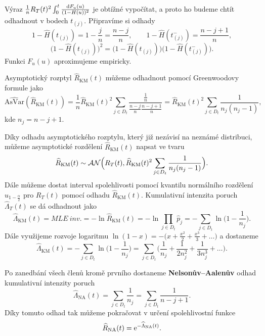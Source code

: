     Výraz $\frac{1}{n}R_T(t)^2 \int_0^t \frac{\mathrm{d} F_u(u)}{(1-H(u))^2}$ je obtížné vypočítat, a proto ho budeme chtít odhadnout v bodech $t_{(j)}$. Připravíme si odhady
    $$ 1 - \widehat{H}(t_{(j)}) = 1 -\frac{j}{n} = \frac{n-j}{n}, \qquad 1 - \widehat{H}(t_{(j)}^{-}) = \frac{n-j+1}{n},$$
    $$ \big(1 - \widehat{H}(t_{(j)})\big)^2 = \big(1 - \widehat{H}(t_{(j)})\big)(1 - \widehat{H}(t_{(j)}^{-})\big).$$ 
    Funkci $F_u(u)$ aproximujeme empiricky.
    
    \begin{theorem}
        Asymptotický rozptyl $\widehat{R}_\mathrm{KM}(t)$ můžeme odhadnout pomocí Greenwoodovy formule jako
        $$ \widehat{\mathrm{AsVar}}(\widehat{R}_\mathrm{KM}(t)) = \frac{1}{n}\widehat{R}_\mathrm{KM}(t)^2 \sum_{j\in D_t} \frac{\frac{1}{n}}{\frac{n-j}{n}\frac{n-j+1}{n}} = \widehat{R}_\mathrm{KM}(t)^2 \sum_{j \in D_t} \frac{1}{n_j(n_j -1)},$$
        kde $n_j = n - j +1$.
    \end{theorem}
    
    Díky odhadu asymptotického rozptylu, který již nezávisí na neznámé distribuci, můžeme asymptotické rozdělení $\widehat{R}_\mathrm{KM}(t)$ napsat ve tvaru
    $$\widehat{R}_\mathrm{KM}(t) \sim \mathcal{AN}\Big(R_T(t), \widehat{R}_\mathrm{KM}(t)^2 \sum_{j \in D_t} \frac{1}{n_j(n_j -1)} \Big).$$
    Dále můžeme dostat interval spolehlivosti pomocí kvantilu normálního rozdělení $u_{1-\frac{\alpha}{2}}$ pro $R_T(t)$ pomocí odhadu $\widehat{R}_\mathrm{KM}(t)$. Kumulativní intenzita poruch $\widehat{\Lambda}_T(t)$ se dá odhadnout jako
    $$\widehat{\Lambda}_\mathrm{KM}(t)\equal{MLE~inv.} = -\ln \widehat{R}_\mathrm{KM}(t) = -\ln \prod_{j\in D_t} \widehat{p}_j = - \sum_{j \in D_t} \ln\Big(1 - \frac{1}{n_j}\Big).$$
    Dále využijeme rozvoje logaritmu $\ln(1-x) = -\Big(x + \frac{x^2}{2} +\frac{x^3}{3}+\dots\Big)$
    a dostaneme 
    $$ \widehat{\Lambda}_\mathrm{KM}(t) = - \sum_{j \in D_t} \ln\Big(1 - \frac{1}{n_j}\Big) = \sum_{j \in D_t} \Big(\frac{1}{n_j} + \frac{1}{2n_j^2} + \frac{1}{3n_j^3} + \dots \Big).$$
    
    \begin{theorem}
        Po zanedbání všech členů kromě prvního dostaneme \textbf{Nelsonův--Aalenův} odhad kumulativní intenzity poruch 
        $$\widehat{\Lambda}_\mathrm{NA}(t)  =\sum_{j\in D_t} \frac{1}{n_j} = \sum_{j \in D_t} \frac{1}{n-j+1}.$$
        Díky tomuto odhad tak můžeme pokračovat v určení spolehlivostní funkce 
        $$ \widehat{R}_\mathrm{NA}(t) =\mathrm{e}^{-\widehat{\Lambda}_\mathrm{NA}(t)}. $$
    \end{theorem}
    
